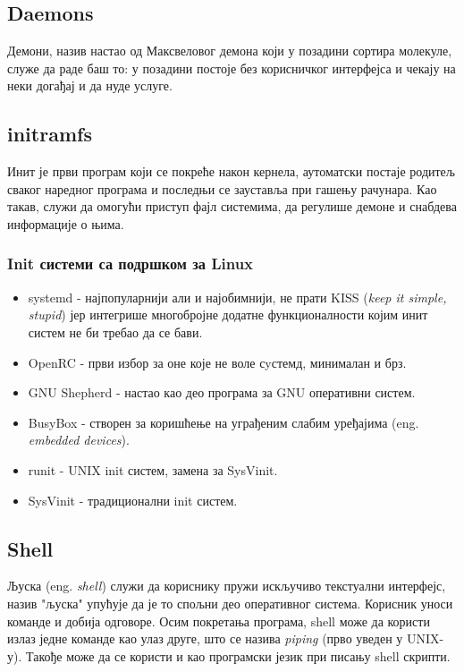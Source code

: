 \documentclass[a4paper,14pt]{article}
\begin{document}
\subsection{Daemons}
Демони\cite{daemon}, назив настао од Максвеловог демона који у позадини сортира молекуле, служе да раде баш то: у позадини постоје без корисничког интерфејса и чекају на неки догађај и да нуде услуге.

\subsection{initramfs}
Инит је први програм који се покреће након кернела, аутоматски постаје родитељ сваког наредног програма и последњи се зауставља при гашењу рачунара. Као такав, служи да омогући приступ фајл системима, да регулише демоне и снабдева информације о њима.
\subsubsection{Init системи са подршком за  Linux}
\begin{itemize}
\item systemd - најпопуларнији али и најобимнији, не прати KISS (\textit{keep it simple, stupid}) јер интегрише многобројне додатне функционалности којим инит систем не би требао да се бави.
\item OpenRC - први избор за оне које не воле сyстемд, минималан и брз.
\item GNU Shepherd - настао као део програма за GNU оперативни систем.
\item BusyBox - створен за коришћење на уграђеним слабим уређајима (eng. \textit{embedded devices}).
\item runit - UNIX init систем, замена за SysVinit.
\item SysVinit - традиционални init систем.
\end{itemize}
\newpage

\subsection{Shell}
Љуска (eng. \textit{shell}) служи да кориснику пружи искључиво текстуални интерфејс, назив "љуска" упућује да је то спољни део оперативног система. Корисник уноси команде и добија одговоре. Осим покретања програма, shell може да користи излаз једне команде као улаз друге, што се назива \textit{piping} (прво уведен у UNIX-у). Такође може да се користи и као програмски језик при писању shell скрипти.
\end{document}
